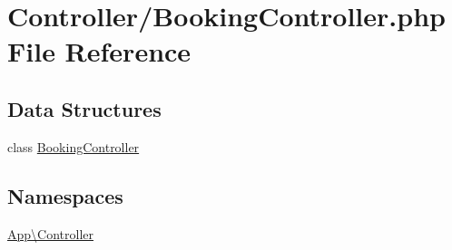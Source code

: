 \hypertarget{_booking_controller_8php}{}\section{Controller/\+Booking\+Controller.php File Reference}
\label{_booking_controller_8php}
\subsection*{Data Structures}
\begin{DoxyCompactItemize}
\item 
class \mbox{\hyperlink{class_app_1_1_controller_1_1_booking_controller}{Booking\+Controller}}
\end{DoxyCompactItemize}
\subsection*{Namespaces}
\begin{DoxyCompactItemize}
\item 
 \mbox{\hyperlink{namespace_app_1_1_controller}{App\textbackslash{}\+Controller}}
\end{DoxyCompactItemize}
